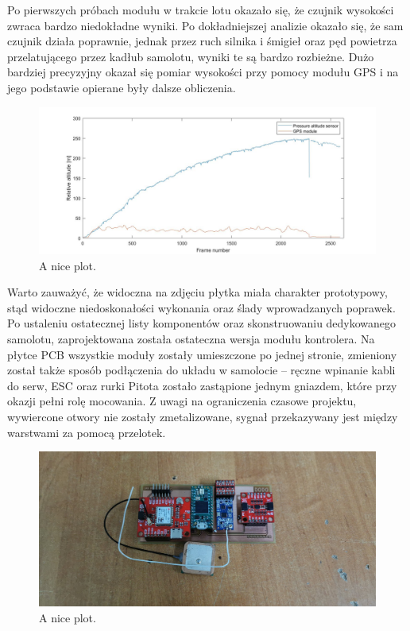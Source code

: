 \documentclass[12pt, a4paper]{article}
\begin{document}
Po pierwszych próbach modułu w trakcie lotu okazało się, że czujnik wysokości zwraca bardzo niedokładne wyniki. Po dokładniejszej analizie okazało się, że sam czujnik działa poprawnie, jednak przez ruch silnika i śmigieł oraz pęd powietrza przelatującego przez kadłub samolotu, wyniki te są bardzo rozbieżne. Dużo bardziej precyzyjny okazał się pomiar wysokości przy pomocy modułu GPS i na jego podstawie opierane były dalsze obliczenia. 
\begin{figure}[ht]
    \centering
    \includegraphics[width=1\textwidth]{alti}
    \caption{A nice plot.}
\end{figure}
Warto zauważyć, że widoczna na zdjęciu płytka miała charakter prototypowy, stąd widoczne niedoskonałości wykonania oraz ślady wprowadzanych poprawek. Po ustaleniu ostatecznej listy komponentów oraz skonstruowaniu dedykowanego samolotu, zaprojektowana została ostateczna wersja modułu kontrolera. Na płytce PCB wszystkie moduły zostały umieszczone po jednej stronie, zmieniony został także sposób podłączenia do układu w samolocie – ręczne wpinanie kabli do serw, ESC oraz rurki Pitota zostało zastąpione jednym gniazdem, które przy okazji pełni rolę mocowania. Z uwagi na ograniczenia czasowe projektu, wywiercone otwory nie zostały zmetalizowane, sygnał przekazywany jest między warstwami za pomocą przelotek.
   \begin{figure}[ht]
    \centering
    \includegraphics[width=1\textwidth]{dodokontroler}
    \caption{A nice plot.}
\end{figure}
\end{document}
